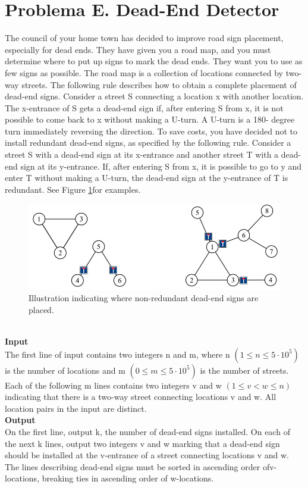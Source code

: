 \documentclass{report}
\begin{document}
\section{Problema E. Dead-End Detector}
The council of your home town has decided to improve road sign placement,
especially for dead ends. They have given you a road map, and you must
determine where to put up signs to mark the dead ends. They want you to
use as few signs as possible.
The road map is a collection of locations connected by two-way streets. The
following rule describes how to obtain a complete placement of dead-end
signs. Consider a street S connecting a location x with another location. The
x-entrance of S gets a dead-end sign if, after entering S from x, it is not
possible to come back to x without making a U-turn. A U-turn is a 180-
degree turn immediately reversing the direction.
To save costs, you have decided not to install redundant dead-end signs, as specified by the following
rule. Consider a street S with a dead-end sign at its x-entrance and another street T with a dead-end
sign at its y-entrance. If, after entering S from x, it is possible to go to y and enter T without making a
U-turn, the dead-end sign at the y-entrance of T is redundant. See Figure \ref{DeadEnd}for examples.
\begin{figure}[h]
	\begin{center}\includegraphics[scale=0.45]{DeadEnd}\end{center}
	\caption{Illustration indicating where non-redundant dead-end signs
		are placed.}	
	\label{DeadEnd}
\end{figure}\\
{\bf Input}\\
The first line of input contains two integers n and m, where n $(1 \leq n \leq 5 \cdot 10^5)$ is the number of
locations and m $(0 \leq m \leq 5 \cdot 10^5)$ is the number of streets. Each of the following m lines contains two
integers v and w $(1 \leq v < w \leq n)$ indicating that there is a two-way street connecting locations v and
w. All location pairs in the input are distinct.\\
{\bf Output}\\
On the first line, output k, the number of dead-end signs installed. On each of the next k lines, output two
integers v and w marking that a dead-end sign should be installed at the v-entrance of a street connecting
locations v and w. The lines describing dead-end signs must be sorted in ascending order ofv-locations,
breaking ties in ascending order of w-locations.
\end{document}
